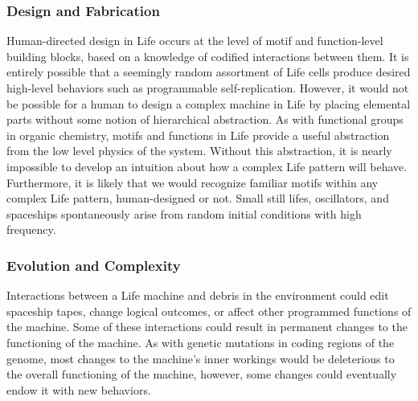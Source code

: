 {\subsubsection{Design and Fabrication}

Human-directed design in Life occurs at the level of motif and function-level building blocks, based on a knowledge of codified interactions between them.  It is entirely possible that a seemingly random assortment of Life cells produce desired high-level behaviors such as programmable self-replication.  However, it would not be possible for a human to design a complex machine in Life by placing elemental parts without some notion of hierarchical abstraction.  As with functional groups in organic chemistry, motifs and functions in Life provide a useful abstraction from the low level physics of the system.  Without this abstraction, it is nearly impossible to develop an intuition about how a complex Life pattern will behave.  Furthermore, it is likely that we would recognize familiar motifs within any complex Life pattern, human-designed or not.  Small still lifes, oscillators, and spaceships spontaneously arise from random initial conditions with high frequency\cite{Flammenkamp2004}.

\subsubsection{Evolution and Complexity}

Interactions between a Life machine and debris in the environment could edit spaceship tapes, change logical outcomes, or affect other programmed functions of the machine.  Some of these interactions could result in permanent changes to the functioning of the machine.  As with genetic mutations in coding regions of the genome, most changes to the machine's inner workings would be deleterious to the overall functioning of the machine, however, some changes could eventually endow it with new behaviors.

}
